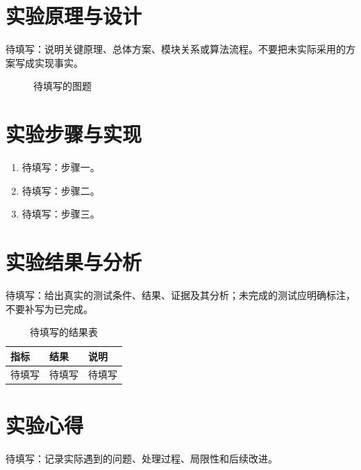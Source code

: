 \documentclass[12pt,a4paper]{article}
\begin{document}
\section{实验原理与设计}
\textcolor{notegray}{待填写：说明关键原理、总体方案、模块关系或算法流程。不要把未实际采用的方案写成实现事实。}

\begin{figure}[H]
  \centering
  \fbox{\rule{0pt}{5cm}\rule{0.85\linewidth}{0pt}}
  \caption{待填写的图题}
  \label{fig:placeholder}
\end{figure}

\section{实验步骤与实现}
\begin{enumerate}
  \item \textcolor{notegray}{待填写：步骤一。}
  \item \textcolor{notegray}{待填写：步骤二。}
  \item \textcolor{notegray}{待填写：步骤三。}
\end{enumerate}

\section{实验结果与分析}
\textcolor{notegray}{待填写：给出真实的测试条件、结果、证据及其分析；未完成的测试应明确标注，不要补写为已完成。}

\begin{table}[H]
  \centering
  \caption{待填写的结果表}
  \label{tab:placeholder}
  \begin{tabular}{lll}
    \toprule
    指标 & 结果 & 说明 \\
    \midrule
    待填写 & 待填写 & 待填写 \\
    \bottomrule
  \end{tabular}
\end{table}

\section{实验心得}
\textcolor{notegray}{待填写：记录实际遇到的问题、处理过程、局限性和后续改进。}
\end{document}
